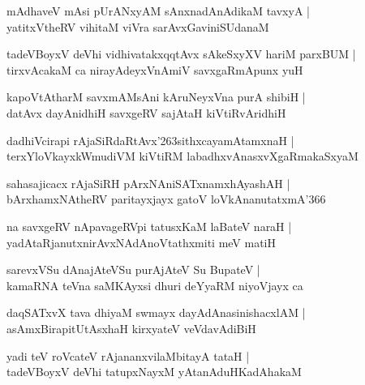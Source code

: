 \documentclass[twoside,12pt,openright]{book}
\def\S{\char'263}
\newcounter{shloka}[chapter]
\begin{document}
\begin{shloka}%
mAdhaveV mAsi pUrANxyAM sAnxnadAnAdikaM tavxyA |\\
yatitxVtheRV vihitaM viVra sarAvxGaviniSUdanaM 
\end{shloka}

\begin{shloka}%
tadeVBoyxV deVhi vidhivatakxqqtAvx sAkeSxyXV hariM parxBUM |\\
tirxvAcakaM ca nirayAdeyxVnAmiV savxgaRmApunx yuH 
\end{shloka}

\begin{shloka}%
kapoVtAtharM savxmAMsAni kAruNeyxVna purA shibiH |\\
datAvx dayAnidhiH savxgeRV sajAtaH kiVtiRvAridhiH 
\end{shloka}

\begin{shloka}%
dadhiVcirapi rAjaSiRdaRtAvx\S sithxcayamAtamxnaH |\\
terxYloVkayxkWmudiVM kiVtiRM labadhxvAnasxvXgaRmakaSxyaM 
\end{shloka}

\begin{shloka}%
sahasajicacx rAjaSiRH pArxNAniSATxnamxhAyashAH |\\
bArxhamxNAtheRV paritayxjayx gatoV loVkAnanutatxmA\char'366
\end{shloka}

\begin{shloka}%
na savxgeRV nApavageRVpi tatusxKaM laBateV naraH |\\
yadAtaRjanutxnirAvxNAdAnoVtathxmiti meV matiH 
\end{shloka}

\begin{shloka}%
sarevxVSu dAnajAteVSu purAjAteV Su BupateV |\\
kamaRNA teVna saMKAyxsi dhuri deYyaRM niyoVjayx ca 
\end{shloka}

\begin{shloka}%
daqSATxvX tava dhiyaM swmayx dayAdAnasinishacxlAM |\\
asAmxBirapitUtAsxhaH kirxyateV veVdavAdiBiH 
\end{shloka}

\begin{shloka}%
yadi teV roVcateV rAjananxvilaMbitayA tataH |\\
tadeVBoyxV deVhi tatupxNayxM yAtanAduHKadAhakaM 
\end{shloka}
\end{document}
